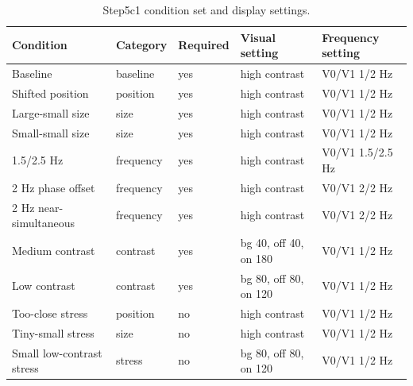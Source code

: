 \begin{table}[htbp]
\centering
\small
\begin{tabular}{p{}p{}p{}p{}p{}}
\toprule
Condition & Category & Required & Visual setting & Frequency setting \\
\midrule
Baseline & baseline & yes & high contrast & V0/V1 1/2 Hz \\
Shifted position & position & yes & high contrast & V0/V1 1/2 Hz \\
Large-small size & size & yes & high contrast & V0/V1 1/2 Hz \\
Small-small size & size & yes & high contrast & V0/V1 1/2 Hz \\
1.5/2.5 Hz & frequency & yes & high contrast & V0/V1 1.5/2.5 Hz \\
2 Hz phase offset & frequency & yes & high contrast & V0/V1 2/2 Hz \\
2 Hz near-simultaneous & frequency & yes & high contrast & V0/V1 2/2 Hz \\
Medium contrast & contrast & yes & bg 40, off 40, on 180 & V0/V1 1/2 Hz \\
Low contrast & contrast & yes & bg 80, off 80, on 120 & V0/V1 1/2 Hz \\
Too-close stress & position & no & high contrast & V0/V1 1/2 Hz \\
Tiny-small stress & size & no & high contrast & V0/V1 1/2 Hz \\
Small low-contrast stress & stress & no & bg 80, off 80, on 120 & V0/V1 1/2 Hz \\
\bottomrule
\end{tabular}
\caption{Step5c1 condition set and display settings.}
\label{tab:conditions}
\end{table}